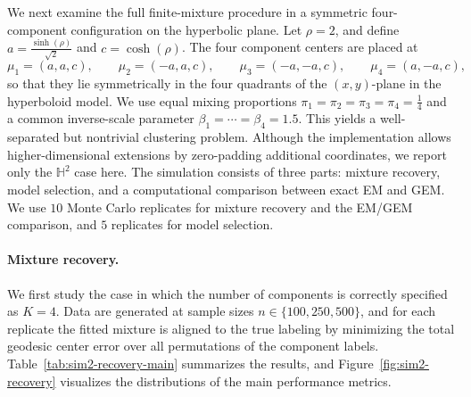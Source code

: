 \documentclass[11pt]{article}
\begin{document}
We next examine the full finite-mixture procedure in a symmetric four-component configuration on the hyperbolic plane. Let \(\rho=2\), and define $a=\frac{\sinh(\rho)}{\sqrt{2}}$ and $c = \cosh(\rho)$.
The four component centers are placed at
\[
\mu_1=(a,a,c),\qquad
\mu_2=(-a,a,c),\qquad
\mu_3=(-a,-a,c),\qquad
\mu_4=(a,-a,c),
\]
so that they lie symmetrically in the four quadrants of the \((x,y)\)-plane in the hyperboloid model. We use equal mixing proportions $\pi_1=\pi_2=\pi_3=\pi_4=\tfrac{1}{4}$ and a common inverse-scale parameter \(\beta_1=\cdots=\beta_4=1.5\). This yields a well-separated but nontrivial clustering problem. Although the implementation allows higher-dimensional extensions by zero-padding additional coordinates, we report only the \(\mathbb{H}^2\) case here. The simulation consists of three parts: mixture recovery, model selection, and a computational comparison between exact EM and GEM. We use \(10\) Monte Carlo replicates for mixture recovery and the EM/GEM comparison, and \(5\) replicates for model selection.

\paragraph{Mixture recovery.}
We first study the case in which the number of components is correctly specified as \(K=4\). Data are generated at sample sizes \(n\in\{100,250,500\}\), and for each replicate the fitted mixture is aligned to the true labeling by minimizing the total geodesic center error over all permutations of the component labels. Table~\ref{tab:sim2-recovery-main} summarizes the results, and Figure~\ref{fig:sim2-recovery} visualizes the distributions of the main performance metrics.

\begin{table}[t]
\centering
\small
\caption{
Finite-mixture recovery on \(\mathbb{H}^2\) with the number of components correctly specified as \(K=4\). 
Reported values are medians with interquartile ranges in parentheses.
}
\label{tab:sim2-recovery-main}

\end{table}
\end{document}
